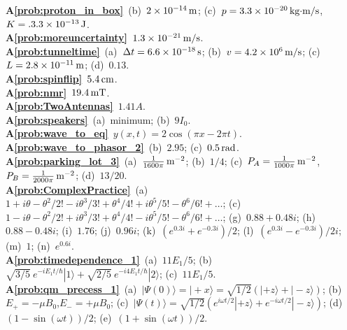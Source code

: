 {\bf A\ref{prob:proton_in_box}}~(b)~$2 \times 10^{-14}\,\mbox{m}$;
(c)~$p = 3.3 \times 10^{-20}\,\mbox{kg$\cdot$m/s}$, 
$K = .3.3 \times 10^{-13}\,\mbox{J}$.\\
{\bf A\ref{prob:moreuncertainty}}~$1.3 \times 10^{-21} \,\mbox{m/s}$.\\
{\bf A\ref{prob:tunneltime}}~(a)~$\Delta t = 6.6 \times 10^{-18}\,\mbox{s}$; 
(b)~$v = 4.2 \times 10^6\,\mbox{m/s}$; (c)~$L = 2.8 \times 10^{-11}\,\mbox{m}$;
(d)~$0.13$.\\
{\bf A\ref{prob:spinflip}}~$5.4\,\mbox{cm}$. \\
{\bf A\ref{prob:nmr}}~$19.4\,\mbox{mT}$. \\
{\bf A\ref{prob:TwoAntennas}}~$1.41A$.\\
{\bf A\ref{prob:speakers}}~(a)~minimum; (b)~$9I_0$.\\
{\bf A\ref{prob:wave_to_eq}}~$y(x,t) = 2\cos{(\pi x - 2\pi t)}$.\\
{\bf A\ref{prob:wave_to_phasor_2}}~(b)~$2.95$; (c)~$0.5\,\mbox{rad}$.\\
{\bf A\ref{prob:parking_lot_3}}~(a)~$\frac{1}{1600\pi}\,\mbox{m$^{-2}$}$; 
(b)~$1/4$; (c)~$P_A = \frac{1}{1000\pi}\,\mbox{m$^{-2}$}$, 
$P_B = \frac{1}{2000\pi}\,\mbox{m$^{-2}$}$; (d)~$13/20$.\\
{\bf A\ref{prob:ComplexPractice}}~(a)~$1 + i\theta - \theta^2/2! -i\theta^3/3! 
+ \theta^4/4! + i\theta^5/5! - \theta^6/6! + \dots$;
(c)~$1 - i\theta - \theta^2/2! + i\theta^3/3! 
+ \theta^4/4! - i\theta^5/5! - \theta^6/6! + \dots$;
(g)~$0.88 + 0.48i$; (h)~$0.88 -0.48i$; (i)~$1.76$; (j)~$0.96i$;
(k)~$\left(e^{0.3i} + e^{-0.3i}\right)/2$;  
(l)~$\left(e^{0.3i} - e^{-0.3i}\right)/2i$; (m)~$1$; (n)~$e^{0.6i}$.\\
{\bf A\ref{prob:timedependence_1}}~(a)~$11E_1/5$; 
(b)~$\sqrt{3/5}\ e^{-iE_1t/\hbar}|1\rangle  + \sqrt{2/5}\ e^{-i4E_1t/\hbar}|2\rangle $;
(c)~$11E_1/5$.\\
{\bf A\ref{prob:qm_precess_1}}~(a)~$|\Psi(0)\rangle  = |\mbox{$+$}x\rangle  
= \sqrt{1/2}\left(|\mbox{$+$}z\rangle  + |\mbox{$-$}z\rangle \right)$; (b)~$E_+ = -\mu B_0$,$E_- = +\mu B_0$;
(c)~$|\Psi(t)\rangle  = \sqrt{1/2}\left(e^{i\omega t/2}|\mbox{$+$}z\rangle  + e^{-i\omega t/2}|\mbox{$-$}z\rangle\right)$;
(d)~$\left(1 -\sin{\left(\omega t\right)}\right)/2$;
(e)~$\left(1 +\sin{\left(\omega t\right)}\right)/2$.\\
